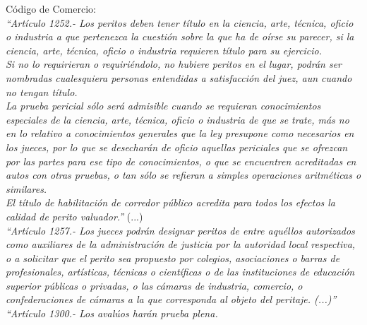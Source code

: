 
\textcolor{principal}{Código de Comercio:}\\[10pt]

\textit{``Artículo 1252.- Los peritos deben tener título en la ciencia, arte, técnica, oficio o industria a que pertenezca la cuestión sobre la que ha de oírse su parecer, si la ciencia, arte, técnica, oficio o industria requieren título para su ejercicio.}\\[10pt]

\textit{Si no lo requirieran o requiriéndolo, no hubiere peritos en el lugar, podrán ser nombradas cualesquiera personas entendidas a satisfacción del juez, aun cuando no tengan título.}\\

\textit{La prueba pericial sólo será admisible cuando se requieran conocimientos especiales de la ciencia, arte, técnica, oficio o industria de que se trate, más no en lo relativo a conocimientos generales que la ley presupone como necesarios en los jueces, por lo que se desecharán de oficio aquellas periciales que se ofrezcan por las partes para ese tipo de conocimientos, o que se encuentren acreditadas en autos con otras pruebas, o tan sólo se refieran a simples operaciones aritméticas o similares.} \\[10pt] 

\textit{El título de habilitación de corredor público acredita para todos los efectos la calidad de perito valuador.''} (...)\\[10pt]

\textit{``Artículo 1257.- Los jueces podrán designar peritos de entre aquéllos autorizados como auxiliares de la administración de justicia por la autoridad local respectiva, o a solicitar que el perito sea propuesto por colegios, asociaciones o barras de profesionales, artísticas, técnicas o científicas o de las instituciones de educación superior públicas o privadas, o las cámaras de industria, comercio, o confederaciones de cámaras a la que corresponda al objeto del peritaje.  (...)''}\\[10pt]

\textit{``Artículo 1300.- Los avalúos harán prueba plena.}\\[10pt]

